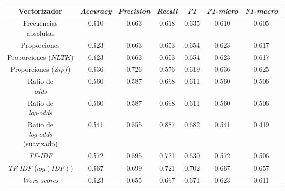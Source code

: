 \begin{table}[ht]
    \centering
    \begin{tabular}{ |c|c|c|c|c|c|c| }
        \hline
        Vectorizador & \textit{Accuracy} & \textit{Precision} & \textit{Recall} & \textit{F1} & \textit{F1-micro} & \textit{F1-macro} \\
        \hline\hline
        \makecell{Frecuencias\\absolutas} & 0.610 & 0.663 & 0.618 & 0.635 & 0.610 & 0.605 \\
        \hline
        Proporciones & 0.623 & 0.663 & 0.653 & 0.654 & 0.623 & 0.617 \\
        \hline
        \makecell{Proporciones\\($NLTK$)} & 0.623 & 0.663 & 0.653 & 0.654 & 0.623 & 0.617 \\
        \hline
        \makecell{Proporciones\\($Zipf$)} & 0.636 & \cellcolor{highlight-table!60}0.726 & 0.576 & 0.619 & 0.636 & 0.625 \\
        \hline
        \makecell{Ratio de\\\textit{odds}} & 0.560 & 0.587 & 0.698 & 0.611 & 0.560 & 0.506 \\
        \hline
        \makecell{Ratio de\\\textit{log-odds}} & 0.560 & 0.587 & 0.698 & 0.611 & 0.560 & 0.506 \\
        \hline
        \makecell{Ratio de\\\textit{log-odds}\\(suavizado)} & 0.541 & 0.555 & \cellcolor{highlight-table!60}0.887 & 0.682 & 0.541 & 0.419 \\
        \hline
        \textit{TF-IDF} & 0.572 & 0.595 & 0.731 & 0.630 & 0.572 & 0.506 \\
        \hline
        \makecell{\textit{TF-IDF}\\($log(IDF)$)} & \cellcolor{highlight-table!60}0.667 & 0.699 & 0.721 & \cellcolor{highlight-table!60}0.702 & \cellcolor{highlight-table!60}0.667 & \cellcolor{highlight-table!60}0.657 \\
        \hline
        \textit{Word scores} & 0.623 & 0.655 & 0.697 & 0.671 & 0.623 & 0.611 \\
        \hline
    \end{tabular}
\end{table}
